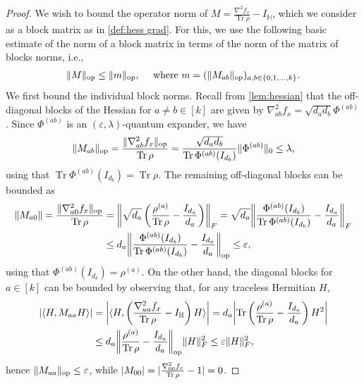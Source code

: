 \documentclass[aos]{imsart}
\theoremstyle{definition}
\numberwithin{equation}{section}
\DeclareMathOperator{\op}{op}
\DeclareMathOperator{\tr}{Tr}
\DeclarePairedDelimiter{\abs}{\lvert}{\rvert}
\DeclarePairedDelimiter{\norm}{\lVert}{\rVert}
\renewcommand{\H}{{\mathbb{H}}}
\newcommand{\eps}{\varepsilon}
\newcommand{\samp}{x}
\begin{document}
\begin{proof}
We wish to bound the operator norm of $M = \frac{\nabla^2 f_\samp}{\tr \rho} - I_\H$, which we consider as a block matrix as in \cref{def:hess grad}.
For this, we use the following basic estimate of the norm of a block matrix in terms of the norm of the matrix of blocks norms, i.e.,
\begin{align}\label{eq:baby norm bounds}
  \norm{M}_{\op} \leq \norm{m}_{\op},
\quad \text{ where } m=(\norm{M_{ab}}_{\op})_{a,b\in\{0,1,\dots,k\}}.
\end{align}
We first bound the individual block norms.
Recall from \cref{lem:hessian} that the off-diagonal blocks of the Hessian for $a \neq b\in[k]$ are given by $\nabla^2_{ab} f_x = \sqrt{d_a d_b} \Phi^{(ab)}$.
Since $\Phi^{(ab)}$ is an $(\eps,\lambda)$-quantum expander, we have
\begin{align*}
  \norm{M_{ab}}_{\op}
= \frac{\norm{\nabla^2_{ab} f_x}_{\op}}{\tr\rho}
= \frac{\sqrt{d_a d_b}}{\tr \Phi^{(ab)}(I_{d_b})} \norm{\Phi^{(ab)}}_0
\leq \lambda,
\end{align*}
using that $\tr \Phi^{(ab)}(I_{d_b}) = \tr \rho$.
The remaining off-diagonal blocks can be bounded as
\begin{align*}
\norm{M_{a0}}
= \frac{\norm{\nabla^2_{a0} f_x}_{\op}}{\tr \rho}
&= \norm*{\sqrt{d_a} \left( \frac{\rho^{(a)}}{\tr \rho} - \frac{I_{d_a}}{d_a} \right)}_F
= \sqrt{d_a} \norm*{\frac{\Phi^{(ab)}(I_{d_b})}{\tr \Phi^{(ab)}(I_{d_b})} - \frac{I_{d_a}}{d_a}}_F \\
&\leq d_a \norm*{\frac{\Phi^{(ab)}(I_{d_b})}{\tr \Phi^{(ab)}(I_{d_b})} - \frac{I_{d_a}}{d_a}}_{\op}
\leq \eps,
\end{align*}
using that $\Phi^{(ab)}(I_{d_b}) = \rho^{(a)}$.
On the other hand, the diagonal blocks for $a\in[k]$ can be bounded by observing that, for any traceless Hermitian $H$,
\begin{align*}
  \abs{\braket{H, M_{aa} H}}
&= \abs*{\braket{H, \left( \frac{\nabla^2_{aa} f_x}{\tr \rho} - I_\H \right) H}}
= d_a \abs*{\tr \left( \frac{\rho^{(a)}}{\tr \rho} - \frac{I_{d_a}}{d_a} \right) H^2} \\
&\leq d_a \norm*{\frac{\rho^{(a)}}{\tr \rho} - \frac{I_{d_a}}{d_a}}_{\op} \norm{H}_F^2
\leq \eps \norm H_F^2,
\end{align*}
hence $\norm{M_{aa}}_{\op} \leq \eps$, while $\abs{M_{00}} = \abs{\frac{\nabla^2_{00} f_x}{\tr \rho} - 1} = 0$.

\end{proof}
\end{document}
